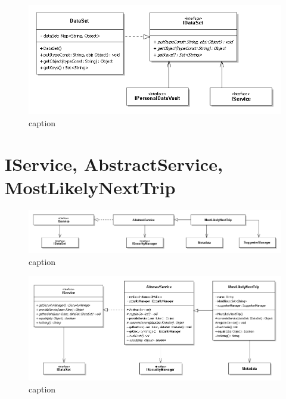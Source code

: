 \begin{figure} [h]
	\includegraphics[width=\linewidth]{pictures/IDataSet.png}
	\caption{caption}
	\label{fig:IDataSet}
\end{figure}

\section{IService, AbstractService, MostLikelyNextTrip}
\label{sec:P-Service}
\begin{figure} [h]
	\includegraphics[width=\linewidth]{pictures/Services-closed.png}
	\caption{caption}
	\label{fig:Services-closed}
\end{figure}

\begin{figure} [h]
	\includegraphics[width=\linewidth]{pictures/Services-open.png}
	\caption{caption}
	\label{fig:Services-open}
\end{figure}

